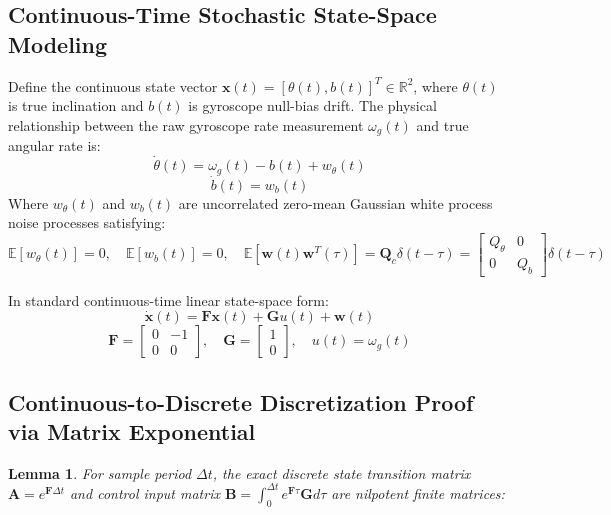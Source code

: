 \documentclass[11pt, a4paper]{article}
\newtheorem{lemma}[theorem]{Lemma}
\begin{document}
\subsection{Continuous-Time Stochastic State-Space Modeling}
Define the continuous state vector $\mathbf{x}(t) = [\theta(t), b(t)]^T \in \mathbb{R}^2$, where $\theta(t)$ is true inclination and $b(t)$ is gyroscope null-bias drift. The physical relationship between the raw gyroscope rate measurement $\omega_g(t)$ and true angular rate is:
\begin{equation}
    \dot{\theta}(t) = \omega_g(t) - b(t) + w_\theta(t)
\end{equation}
\begin{equation}
    \dot{b}(t) = w_b(t)
\end{equation}
Where $w_\theta(t)$ and $w_b(t)$ are uncorrelated zero-mean Gaussian white process noise processes satisfying:
\begin{equation}
    \mathbb{E}[w_\theta(t)] = 0, \quad \mathbb{E}[w_b(t)] = 0, \quad \mathbb{E}[\mathbf{w}(t) \mathbf{w}^T(\tau)] = \mathbf{Q}_c \delta(t - \tau) = \begin{bmatrix} Q_\theta & 0 \\ 0 & Q_b \end{bmatrix} \delta(t - \tau)
\end{equation}

In standard continuous-time linear state-space form:
\begin{equation}
    \dot{\mathbf{x}}(t) = \mathbf{F} \mathbf{x}(t) + \mathbf{G} u(t) + \mathbf{w}(t)
\end{equation}
\begin{equation}
    \mathbf{F} = \begin{bmatrix} 0 & -1 \\ 0 & 0 \end{bmatrix}, \quad \mathbf{G} = \begin{bmatrix} 1 \\ 0 \end{bmatrix}, \quad u(t) = \omega_g(t)
\end{equation}

\subsection{Continuous-to-Discrete Discretization Proof via Matrix Exponential}
\begin{lemma}
For sample period $\Delta t$, the exact discrete state transition matrix $\mathbf{A} = e^{\mathbf{F}\Delta t}$ and control input matrix $\mathbf{B} = \int_0^{\Delta t} e^{\mathbf{F}\tau} \mathbf{G} d\tau$ are nilpotent finite matrices:
\end{lemma}
\end{document}
